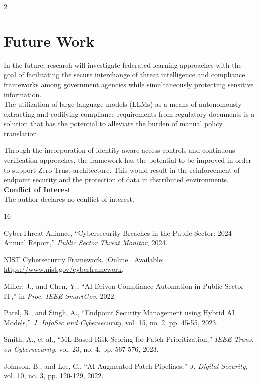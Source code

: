 \documentclass[10pt]{article} %
\begin{document}
\begin{multicols}{2}
\vspace{-10pt} \section{Future Work}

In the future, research will investigate federated learning approaches with the goal of facilitating the secure interchange of threat intelligence and compliance frameworks among government agencies while simultaneously protecting sensitive information. \\  
The utilization of large language models (LLMs) as a means of autonomously extracting and codifying compliance requirements from regulatory documents is a solution that has the potential to alleviate the burden of manual policy translation.  

 Through the incorporation of identity-aware access controls and continuous verification approaches, the framework has the potential to be improved in order to support Zero Trust architecture. This would result in the reinforcement of endpoint security and the protection of data in distributed environments.\\


\noindent \textbf{Conflict of Interest} \\
The author declares no conflict of interest.




\begin{thebibliography}{16}

CyberThreat Alliance, ``Cybersecurity Breaches in the Public Sector: 2024 Annual Report,'' \textit{Public Sector Threat Monitor}, 2024.

NIST Cybersecurity Framework. [Online]. Available: \url{https://www.nist.gov/cyberframework}.

Miller, J., and Chen, Y., ``AI-Driven Compliance Automation in Public Sector IT,'' in \textit{Proc. IEEE SmartGov}, 2022.

Patel, R., and Singh, A., ``Endpoint Security Management using Hybrid AI Models,'' \textit{J. InfoSec and Cybersecurity}, vol. 15, no. 2, pp. 45-55, 2023.

Smith, A., et al., ``ML-Based Risk Scoring for Patch Prioritization,'' \textit{IEEE Trans. on Cybersecurity}, vol. 23, no. 4, pp. 567-576, 2023.

Johnson, B., and Lee, C., ``AI-Augmented Patch Pipelines,'' \textit{J. Digital Security}, vol. 10, no. 3, pp. 120-129, 2022.


\end{thebibliography}
\end{multicols}
\end{document}
